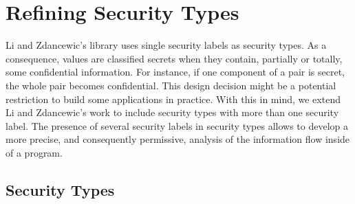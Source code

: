 \documentclass[times, 10pt,twocolumn]{article}
\begin{document}
\section{Refining Security Types} \label{sec:refining-types}


Li and Zdancewic's library uses single security labels as 
security types. As a consequence, values are classified 
secrets when they contain, partially or totally, some 
confidential information. For instance, if one component of a pair is
secret, the whole pair becomes confidential. This design 
decision might be a potential restriction to build some applications 
in practice. With this in mind, we  extend 
Li and Zdancewic's work to include security types with more than one security
label. The presence of several security labels 
in security types allows to develop a more precise, and consequently
permissive, analysis of the information flow inside of a program. 


\subsection{Security Types} \label{sec:extendedST}
\end{document}
